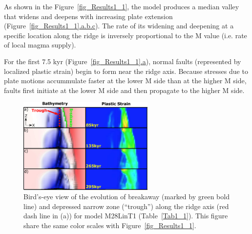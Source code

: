 As shown in the Figure~\hyperref[fig_Results1_1]{\ref{fig_Results1_1}}, the model produces a median valley that widens and deepens with increasing plate extension (Figure~\hyperref[fig_Results1_1]{\ref{fig_Results1_1}.a.b.c}). The rate of its widening and deepening at a specific location along the ridge is inversely proportional to the M value (i.e. rate of local magma supply). %

For the first 7.5 kyr (Figure~\hyperref[fig_Results1_1]{\ref{fig_Results1_1}.a}), %
normal faults (represented by localized plastic strain) begin to form near the ridge axis.
Because stresses due to plate motions accummulate faster at the lower M side than at the higher M side, faults first initiate at the lower M side and then propagate to the higher M side.

\begin{figure}[h]
  \centering
    \includegraphics[width=0.6\textwidth]{./Figures/fig_Results1_4.eps}
  \caption{Bird's-eye view of the evolution of breakaway (marked by green bold line) and depressed narrow zone (``trough'') along the ridge axis (red dash line in (a)) for model M28LinT1 (Table~\hyperref[Tab1_1]{\ref{Tab1_1}}). This figure share the same color scales with Figure~\hyperref[fig_Results1_1]{\ref{fig_Results1_1}}.}
 \label{fig_Results1_4}
\end{figure}

